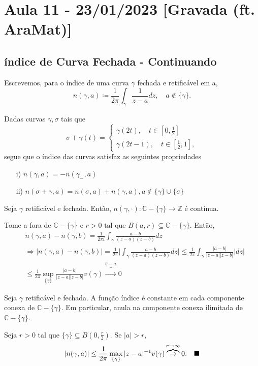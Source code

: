 \documentclass[complex.tex]{subfiles}
\begin{document}
\section{Aula 11 - 23/01/2023 [Gravada (ft. AraMat)]}
\subsection{índice de Curva Fechada - Continuando}
\begin{def*}
	Escrevemos, para o índice de uma curva $\gamma$ fechada e retificável em a,
	$$
		n(\gamma, a)\coloneqq  \frac{1}{2\pi}\int_{\gamma}^{}\frac{1}{z-a}dz, \quad a\not\in \{\gamma\}.
	$$
\end{def*}
\begin{prop*}
	Dadas curvas $\gamma, \sigma$ tais que
	$$
		\sigma + \gamma(t)  = \left\{\begin{array}{ll}
			\gamma(2t), \quad t\in[0, \frac{1}{2}] \\
			\gamma(2t-1), \quad t\in[\frac{1}{2}, 1],
		\end{array}\right.
	$$
	segue que o índice das curvas satisfaz as seguintes propriedades
	\begin{itemize}
		\item[i)] $n(\gamma, a) = -n(\gamma_{-}, a)$
		\item[ii)] $n(\sigma+\gamma, a) = n(\sigma, a) + n(\gamma, a), a\not\in \{\gamma\}\cup \{\sigma\}$
	\end{itemize}
\end{prop*}
\begin{prop*}
	Seja $\gamma$ retificável e fechada. Então, $n(\gamma, \cdot):\mathbb{C}-\{\gamma\} \rightarrow \mathbb{Z}$ é contínua.
\end{prop*}
\begin{proof*}
	Tome a fora de $\mathbb{C}-\{\gamma\}$ e $r > 0\text{ tal que } B(a, r)\subseteq{\mathbb{C}-\{\gamma\}}$. Então,
	\begin{align*}
		 & n(\gamma, a) - n(\gamma, b) = \frac{1}{2\pi i}\int_{\gamma}^{}\frac{a - b}{(z-a)(z-b)}dz                                                                                       \\
		 & \Rightarrow|n(\gamma, a) - n(\gamma, b)| = \frac{1}{2\pi}\biggl|\int_{\gamma}^{}\frac{a-b}{(z-a)(z-b)}dz\biggr|\leq \frac{1}{2\pi}\int_{\gamma}^{}\frac{|a-b|}{|z-a||z-b|}|dz| \\
		 & \leq\frac{1}{2\pi}\sup_{\{\gamma\} }\frac{|a-b|}{|z-a||z-b|}v(\gamma)\overbrace{\to}^{b-a}0
	\end{align*}
\end{proof*}
\begin{theorem*}
	Seja $\gamma$ retificável e fechada. A função índice é constante em cada componente conexa de $\mathbb{C}-\{\gamma\}.$
	Em particular, anula na componente conexa ilimitada de $\mathbb{C}-\{\gamma\} $.
\end{theorem*}
\begin{proof*}
	Seja $r > 0$ tal que $\{\gamma\}\subseteq{B(0, \frac{r}{2})}.$ Se $|a| > r,$
	$$
		|n(\gamma, a)|\leq \frac{1}{2\pi}\max_{\{\gamma\}}|z-a|^{-1}v(\gamma)\overbrace{\to}^{r\to\infty}0. \quad\text{$\blacksquare$}
	$$
\end{proof*}
\end{document}
